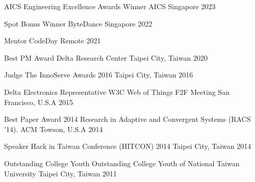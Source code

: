 
\begin{cvhonors}

  \cvhonor
    {AICS Engineering Excellence Awards Winner} %
    {AICS} %
    {Singapore} %
    {2023} %

  \cvhonor
    {Spot Bonus Winner} %
    {ByteDance} %
    {Singapore} %
    {2022} %

  \cvhonor
    {Mentor} %
    {CodeDay} %
    {Remote} %
    {2021} %

  \cvhonor
    {Best PM Award} %
    {Delta Research Center} %
    {Taipei City, Taiwan} %
    {2020} %

  \cvhonor
    {Judge} %
    {The InnoServe Awards 2016} %
    {Taipei City, Taiwan} %
    {2016} %

  \cvhonor
    {Delta Electronics Representative} %
    {W3C Web of Things F2F Meeting} %
    {San Francisco, U.S.A} %
    {2015} %

  \cvhonor
    {Best Paper Award} %
    {2014 Research in Adaptive and Convergent Systems (RACS '14). ACM} %
    {Towson, U.S.A} %
    {2014} %

  \cvhonor
    {Speaker} %
    {Hack in Taiwan Conference (HITCON) 2014} %
    {Taipei City, Taiwan} %
    {2014} %

  \cvhonor
    {Outstanding College Youth} %
    {Outstanding College Youth of National Taiwan University} %
    {Taipei City, Taiwan} %
    {2011} %

\end{cvhonors}
